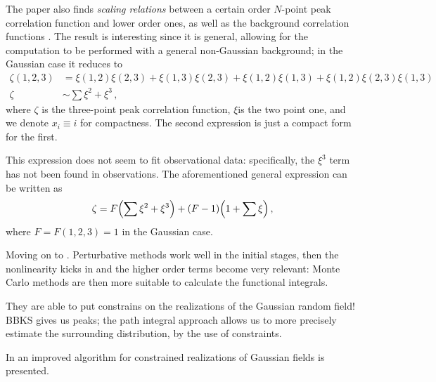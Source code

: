 \documentclass[main.tex]{subfiles}
\begin{document}
The paper also finds \emph{scaling relations} between a certain order \(N\)-point peak correlation function and lower order ones, as well as the background correlation functions \cite[eqs.\ 24--25]{matarresePathintegralApproachLargescale1986}. 
The result is interesting since it is general, allowing for the computation to be performed with a general non-Gaussian background; in the Gaussian case it reduces to 
%
\begin{align}
\zeta (1, 2, 3) &= \xi (1, 2) \xi (2, 3) + \xi (1, 3) \xi (2, 3) + \xi (1, 2) \xi (1, 3) + \xi (1, 2) \xi (2, 3) \xi (1, 3)  \\
\zeta &\sim \sum \xi^2 + \xi^3
\,,
\end{align}
%
where \(\zeta \) is the three-point peak correlation function, \(\xi \)is the two point one, and we denote \(x_i \equiv i\) for compactness. 
The second expression is just a compact form for the first.

This expression does not seem to fit observational data: specifically, the \(\xi^3\) term has not been found in observations. 
The aforementioned general expression can be written as 
%
\begin{align}
\zeta = F \qty(\sum \xi^2 + \xi ^3) + (F-1) \qty(1 + \sum \xi ) 
\,,
\end{align}
%
where \(F = F(1, 2, 3) = 1\) in the Gaussian case. 



Moving on to \cite[]{bertschingerPathIntegralMethods1987}. 
Perturbative methods work well in the initial stages, then the nonlinearity kicks in and the higher order terms become very relevant: Monte Carlo methods are then more suitable to calculate the functional integrals. 

They are able to put constrains on the realizations of the Gaussian random field! 
BBKS gives us peaks; the path integral approach allows us to more precisely estimate the surrounding  distribution, by the use of constraints. 

In \cite[]{hoffmanConstrainedRealizationsGaussian1991} an improved algorithm for constrained realizations of Gaussian fields is presented.

\end{document}
